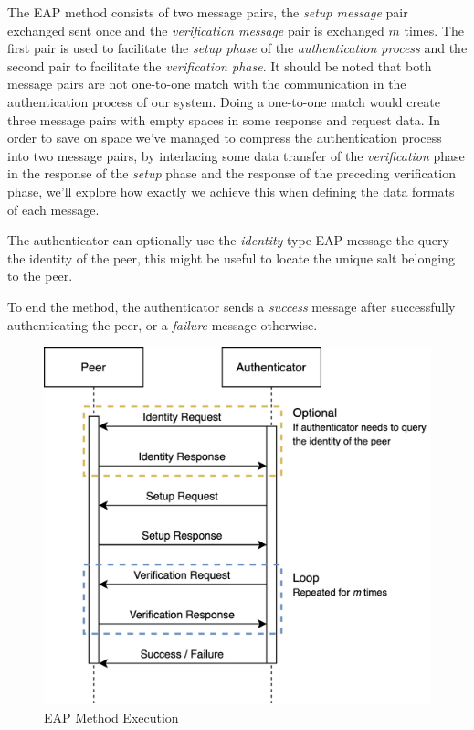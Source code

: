 The EAP method consists of two message pairs, the \textit{setup message} pair exchanged sent once and the \textit{verification message} pair is exchanged $m$ times.
The first pair is used to facilitate the \textit{setup phase} of the \textit{authentication process} and the second pair to facilitate the \textit{verification phase}.
It should be noted that both message pairs are not one-to-one match with the communication in the authentication process of our system. 
Doing a one-to-one match would create three message pairs with empty spaces in some response and request data.
In order to save on space we've managed to compress the authentication process into two message pairs, by interlacing some data transfer of the \textit{verification} phase in the response of the \textit{setup} phase and the response of the preceding verification phase, we'll explore how exactly we achieve this when defining the data formats of each message.

The authenticator can optionally use the \textit{identity} type EAP message the query the identity of the peer, this might be useful to locate the unique salt belonging to the peer.

To end the method, the authenticator sends a \textit{success} message after successfully authenticating the peer, or a \textit{failure} message otherwise.

\begin{figure}[h]
	\centering
	\includegraphics[width=12cm]{images/EAP_Method.png}
	\caption{EAP Method Execution}
	\label{fig:eap-method-protocol}
\end{figure}

